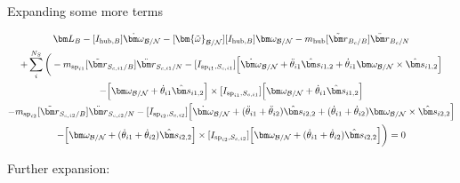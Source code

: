 Expanding some more terms

\begin{multline}
	\bm L_B -[I_{\text{hub},B}] \dot{\bm\omega}_{\cal B/N}  -[\bm{\tilde{\omega}}_{\cal B/N}] [I_{\text{hub},B}] \bm\omega_{\cal B/N} - m_{\text{hub}} [\tilde{{\bm r}}_{B_c/B}] \ddot{\bm r}_{B_c/N} \\
	+ \sum\limits_{i}^{N_S}\bigg(- m_{\text{sp}_{i1}} [\tilde{{\bm r}}_{S_{c,i1}/B}] \ddot{\bm r}_{S_{c,i1}/N} -[I_{\text{sp}_{i1},S_{c,i1}}] \Big[\dot{\bm \omega}_{\cal{B/N}} + \ddot{\theta}_{i1} \hat{\bm s}_{i1,2} + \dot{\theta}_{i1} \bm \omega_{\cal{B/N}} \times \hat{\bm s}_{i1,2}\Big]  \\
	-\Big[\bm \omega_{\cal{B/N}} + \dot{\theta}_{i1} \hat{\bm s}_{i1,2}\Big] \times [I_{\text{sp}_{i1},S_{c,i1}}] \Big[\bm \omega_{\cal{B/N}} + \dot{\theta}_{i1} \hat{\bm s}_{i1,2}\Big]\\
	- m_{\text{sp}_{i2}} [\tilde{{\bm r}}_{S_{c,i2}/B}] \ddot{\bm r}_{S_{c,i2}/N} -[I_{\text{sp}_{i2},S_{c,i2}}] \Big[\dot{\bm \omega}_{\cal{B/N}} + (\ddot{\theta}_{i1}  + \ddot{\theta}_{i2})\hat{\bm s}_{i2,2} + (\dot{\theta}_{i1}  + \dot{\theta}_{i2}) \bm \omega_{\cal{B/N}} \times \hat{\bm s}_{i2,2}\Big]  \\
	-\Big[\bm \omega_{\cal{B/N}} + (\dot{\theta}_{i1}  + \dot{\theta}_{i2})\hat{\bm s}_{i2,2}\Big] \times [I_{\text{sp}_{i2},S_{c,i2}}] \Big[\bm \omega_{\cal{B/N}} + (\dot{\theta}_{i1}  + \dot{\theta}_{i2})\hat{\bm s}_{i2,2}\Big]\bigg) = 0
\end{multline}

Further expansion:

